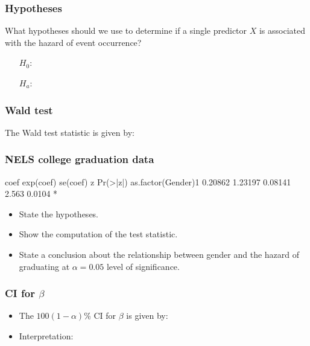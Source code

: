 \begin{frame}
\frametitle{Hypotheses}
What hypotheses should we use to determine if a single predictor $X$ is associated with the hazard of event occurrence?
\begin{itemize}
\item[$H_0$:]
\item[]
\item[]
\item[]
\item[$H_a$:]
\item[]
\item[]
\item[]
\end{itemize}
\end{frame}

\begin{frame}
\frametitle{Wald test}
The Wald test statistic is given by:
\vskip200pt 
\end{frame}

\begin{frame}[fragile]
\frametitle{NELS college graduation data}
\begin{Rout}{-0.05}
                      coef exp(coef) se(coef)     z Pr(>|z|)
as.factor(Gender)1 0.20862   1.23197  0.08141 2.563   0.0104 *
\end{Rout}
\begin{itemize}
\item State the hypotheses.
\item[]
\item Show the computation of the test statistic.
\item[]
\item[]
\item State a conclusion about the relationship between gender and the hazard of graduating at $\alpha=0.05$ level of significance.
\item[]
\item[]
\item[]
\end{itemize}
\end{frame}

\begin{frame}
\frametitle{CI for $\beta$}
\begin{itemize}
\item The $100(1-\alpha)$\% CI for $\beta$ is given by:
\item[]
\item[]
\item[]
\item[]
\item Interpretation:
\item[]
\item[]
\item[]
\item[]
\item[]
\end{itemize}
\end{frame}


